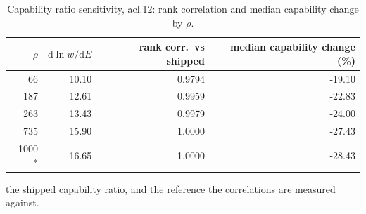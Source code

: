 \begin{table}[htbp]
  \centering
  \caption{Capability ratio sensitivity, acl.12: rank correlation and median capability change by $\rho$.}
  \label{tab:rho-acl-12-summary}
  \begin{tabular}{r r r r}
    \toprule
    $\rho$ & $\mathrm{d}\ln w/\mathrm{d}E$ & rank corr.\ vs shipped & median capability change (\%) \\
    \midrule
    66 & 10.10 & 0.9794 & -19.10 \\
    187 & 12.61 & 0.9959 & -22.83 \\
    263 & 13.43 & 0.9979 & -24.00 \\
    735 & 15.90 & 1.0000 & -27.43 \\
    1000 * & 16.65 & 1.0000 & -28.43 \\
    \bottomrule
  \end{tabular}
  \par\smallskip\footnotesize * the shipped capability ratio, and the reference the correlations are measured against.
\end{table}
